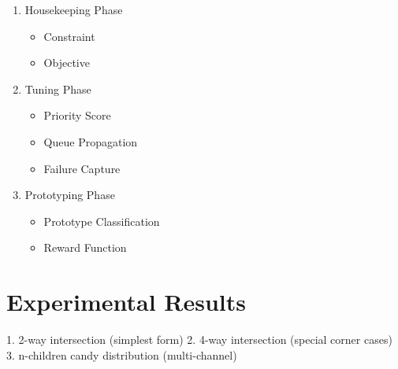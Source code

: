 \documentclass[conference]{IEEEtran}
\begin{document}
\begin{enumerate}
	\item Housekeeping Phase
	\begin{itemize}
		\item Constraint
		\item Objective
	\end{itemize}
	\item Tuning Phase
	\begin{itemize}
		\item Priority Score
		\item Queue Propagation
		\item Failure Capture
	\end{itemize}
	\item Prototyping Phase
	\begin{itemize}
		\item Prototype Classification
		\item Reward Function
	\end{itemize}
\end{enumerate}

\newpage

%
%
%
%
%



\section{Experimental Results}
1. 2-way intersection (simplest form)
2. 4-way intersection (special corner cases)
3. n-children candy distribution (multi-channel)
\end{document}
